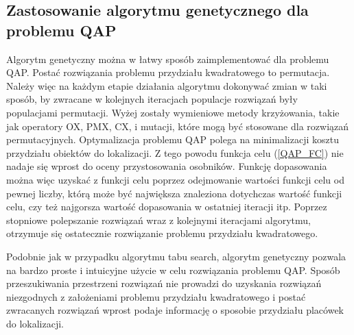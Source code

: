 \subsection{Zastosowanie algorytmu genetycznego dla problemu QAP}
Algorytm genetyczny można w łatwy sposób zaimplementować dla problemu QAP. Postać rozwiązania problemu przydziału kwadratowego to permutacja. Należy więc na każdym etapie działania algorytmu dokonywać zmian w taki sposób, by zwracane w kolejnych iteracjach populacje rozwiązań były populacjami permutacji. Wyżej zostały wymieniowe metody krzyżowania, takie jak operatory OX, PMX, CX, i mutacji, które mogą być stosowane dla rozwiązań permutacyjnych.
Optymalizacja problemu QAP polega na minimalizacji kosztu przydziału obiektów do lokalizacji. Z tego powodu funkcja celu (\ref{QAP_FC}) nie nadaje się wprost do oceny przystosowania osobników. Funkcję dopasowania można więc uzyskać z funkcji celu poprzez odejmowanie wartości funkcji celu od pewnej liczby, którą może być największa znaleziona dotychczas wartość funkcji celu, czy też najgorsza wartość dopasowania w ostatniej iteracji itp. Poprzez stopniowe polepszanie rozwiązań wraz z kolejnymi iteracjami algorytmu, otrzymuje się ostatecznie rozwiązanie problemu przydziału kwadratowego. 

Podobnie jak w przypadku algorytmu tabu search, algorytm genetyczny pozwala na bardzo proste i  intuicyjne użycie w celu rozwiązania problemu QAP. Sposób przeszukiwania przestrzeni rozwiązań nie prowadzi do uzyskania rozwiązań niezgodnych z założeniami problemu przydziału kwadratowego i postać zwracanych rozwiązań wprost podaje informację o sposobie przydziału placówek do lokalizacji.